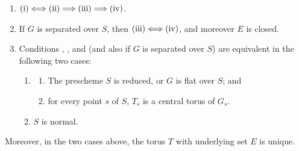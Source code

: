 {\begin{enumerate}
\item[\normalfont A)] \(\textup{(i)}\Longleftrightarrow
\textup{(ii)}\Longrightarrow\textup{(iii)}
\Longrightarrow\textup{(iv)}\).
\item[\normalfont B)] If \(G\) is separated over \(S\), then
\(\textup{(iii)}\Longleftrightarrow\textup{(iv)}\), and moreover
\(E\) is closed.
\item[\normalfont C)] Conditions \textup{}, \textup{}, and
\textup{} (and also \textup{} if \(G\) is separated over
\(S\)) are equivalent in the following two cases:
  \begin{enumerate}
  \item[\normalfont First case:]
    \begin{enumerate}
    \item[\normalfont a)] The prescheme \(S\) is reduced, or \(G\)
    is flat over \(S\); and
    \item[\normalfont b)] for every point \(s\) of \(S\), \(T_s\)
    is a central torus of \(G_s\).
    \end{enumerate}
  \item[\normalfont Second case:] \(S\) is normal.
  \end{enumerate}
\end{enumerate}
Moreover, in the two cases above, the torus \(T\) with underlying
set \(E\) is unique.}

